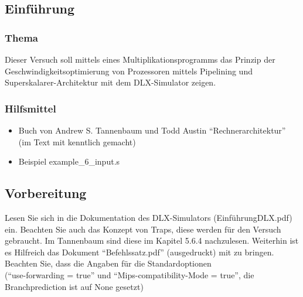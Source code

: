 \subsection*{Einführung}
\einfuehrungstext

\subsubsection*{Thema}
Dieser Versuch soll mittels eines Multiplikationsprogramms das Prinzip der Geschwindigkeitsoptimierung von Prozessoren mittels Pipelining und Superskalarer-Architektur mit dem DLX-Simulator zeigen.

\subsubsection*{Hilfsmittel}
\begin{itemize}
    \item Buch von Andrew S. Tannenbaum und Todd Austin \enquote{Rechnerarchitektur} (im Text mit \cite{TaneRech2014} kenntlich gemacht)
    \item Beispiel example\_6\_input.s
\end{itemize}

\subsection*{Vorbereitung}
Lesen Sie sich in die Dokumentation des DLX-Simulators (EinführungDLX.pdf) ein. 
Beachten Sie auch das Konzept von Traps, diese werden für den Versuch gebraucht. Im Tannenbaum sind diese im Kapitel 5.6.4 nachzulesen.
Weiterhin ist es Hilfreich das Dokument \enquote{Befehlssatz.pdf} (ausgedruckt) mit zu bringen.
Beachten Sie, dass die Angaben für die Standardoptionen \\(\enquote{use-forwarding = true} und \enquote{Mips-compatibility-Mode = true}, die Branchprediction ist auf None gesetzt) 
\newpage
{}
\thispagestyle{empty}
